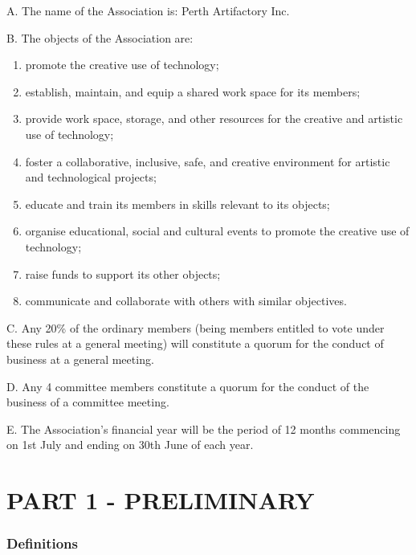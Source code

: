 
A. The name of the Association is: Perth Artifactory Inc.

B. The objects of the Association are:

\begin{enumerate}

\item promote the creative use of technology;
\item establish, maintain, and equip a shared work space for its members;
\item provide work space, storage, and other resources for the creative and artistic use of technology;
\item foster a collaborative, inclusive, safe, and creative environment for artistic and technological projects;
\item educate and train its members in skills relevant to its objects;
\item organise educational, social and cultural events to promote the creative use of technology;
\item raise funds to support its other objects;
\item communicate and collaborate with others with similar objectives.
\end{enumerate}

C. Any 20\% of the ordinary members (being members entitled to vote under these rules at a general meeting) will constitute a quorum for the conduct of business at a general meeting.

D. Any 4 committee members constitute a quorum for the conduct of the business of a committee meeting.

E. The Association's financial year will be the period of 12 months commencing on 1st July and ending on 30th June of each year.

\hypertarget{part-1---preliminary}{%
\part{PART 1 - PRELIMINARY}\label{part-1---preliminary}}

\hypertarget{definitions}{%
\section{Definitions}\label{definitions}}


